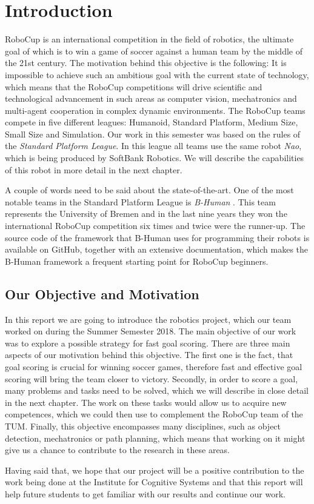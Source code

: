 \chapter{Introduction}

RoboCup \cite{robocup} is an international competition in the field of
robotics, the ultimate goal of which is to win a game of soccer against a human
team by the middle of the 21st century. The motivation behind this objective is
the following: It is impossible to achieve such an ambitious goal with the
current state of technology, which means that the RoboCup competitions will
drive scientific and technological advancement in such areas as computer
vision, mechatronics and multi-agent cooperation in complex dynamic
environments. The RoboCup teams compete in five different leagues: Humanoid,
Standard Platform, Medium Size, Small Size and Simulation. Our work in this
semester was based on the rules of the \textit{Standard Platform League}. In
this league all teams use the same robot \textit{Nao}, which is being produced
by SoftBank Robotics. We will describe the capabilities of this robot in
more detail in the next chapter.

A couple of words need to be said about the state-of-the-art. One of the most
notable teams in the Standard Platform League is \textit{B-Human}
\cite{bhuman}. This team represents the University of Bremen and in the last
nine years they won the international RoboCup competition six times and twice
were the runner-up. The source code of the framework that B-Human uses for
programming their robots is available on GitHub, together with an extensive
documentation, which makes the B-Human framework a frequent starting point for
RoboCup beginners.

\section{Our Objective and Motivation}
\label{sec problem statement}

In this report we are going to introduce the robotics project, which our team
worked on during the Summer Semester 2018. The main objective of our work was
to explore a possible strategy for fast goal scoring. There are three main
aspects of our motivation behind this objective. The first one is the fact,
that goal scoring is crucial for winning soccer games, therefore fast and
effective goal scoring will bring the team closer to victory. Secondly, in
order to score a goal, many problems and tasks need to be solved, which we will
describe in close detail in the next chapter. The work on these tasks would
allow us to acquire new competences, which we could then use to complement the
RoboCup team of the TUM. Finally, this objective encompasses many disciplines, such
as object detection, mechatronics or path planning, which means that working on
it might give us a chance to contribute to the research in these areas.

Having said that, we hope that our project will be a positive contribution to
the work being done at the Institute for Cognitive Systems and that this
report will help future students to get familiar with our results and continue
our work.
